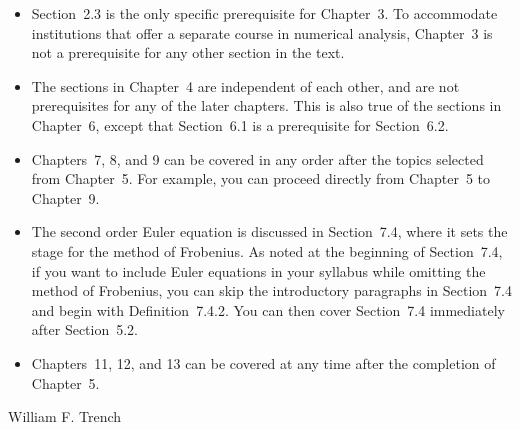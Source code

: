 \begin{itemize}
  \item Section~2.3 is the only specific prerequisite for Chapter~3. To accommodate institutions
        that offer a separate course in numerical analysis, Chapter~3 is not a prerequisite for any
        other section in the text.

  \item The sections in Chapter~4 are independent of each other, and are not prerequisites for any
        of the later chapters. This is also true of the sections in Chapter~6, except that
        Section~6.1 is a prerequisite for Section~6.2.

  \item Chapters~7, 8, and 9 can be covered in any order after the topics selected from Chapter~5.
        For example, you can proceed directly from Chapter~5 to Chapter~9.

  \item The second order Euler equation is discussed in Section~7.4, where it sets the stage for the
        method of Frobenius. As noted at the beginning of Section~7.4, if you want to include Euler
        equations in your syllabus while omitting the method of Frobenius, you can skip the
        introductory paragraphs in Section~7.4 and begin with Definition~7.4.2. You can then cover
        Section~7.4 immediately after Section~5.2.

    \enlargethispage{1in}

  \item Chapters~11, 12, and 13 can be covered at any time after the completion of Chapter~5.
\end{itemize}

\par
\medskip
\noindent
\mbox{\hspace*{275pt}}William F. Trench\mbox{}

\mainmatter
